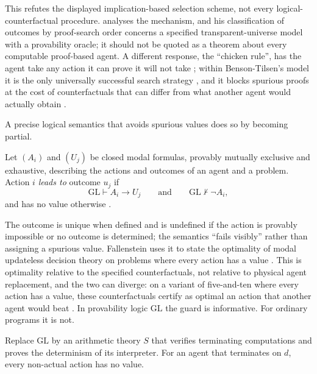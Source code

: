 This refutes the displayed implication-based selection scheme, not every logical-counterfactual
procedure. \textcite[§2]{bensontilsen2014} analyses the mechanism, and his classification of
outcomes by proof-search order concerns a specified transparent-universe model with a provability
oracle; it should not be quoted as a theorem about every computable proof-based agent. A different
response, the \enquote{chicken rule}, has the agent take any action it can prove it will not take
\autocite{slepnev2011}; within Benson-Tilsen's model it is the only universally successful search
strategy \autocite[Corollary~4.6]{bensontilsen2014}, and it blocks spurious proofs at the cost of
counterfactuals that can differ from what another agent would actually obtain
\autocite{fallenstein2015chicken}.

A precise logical semantics that avoids spurious values does so by becoming partial.

\begin{definition}\label{def:guarded}
Let $(A_i)$ and $(U_j)$ be closed modal formulas, provably mutually exclusive and exhaustive, describing
the actions and outcomes of an agent and a problem. Action $i$ \emph{leads to} outcome $u_j$ if
\[
  \mathrm{GL}\vdash A_i\to U_j\qquad\text{and}\qquad\mathrm{GL}\nvdash\neg A_i,
\]
and has no value otherwise \autocite{fallenstein2015third}.
\end{definition}

The outcome is unique when defined and is undefined if the action is provably impossible or no
outcome is determined; the semantics \enquote{fails visibly} rather than assigning a spurious value.
Fallenstein uses it to state the optimality of modal updateless decision theory on problems where
every action has a value \autocite{fallenstein2015third}. This is optimality relative to the specified
counterfactuals, not relative to physical agent replacement, and the two can diverge: on a variant of
five-and-ten where every action has a value, these counterfactuals certify as optimal an action that
another agent would beat \autocite{fallenstein2015chicken}. In provability logic $\mathrm{GL}$
\autocite{boolos1993} the guard is informative. For ordinary programs it is not.

\begin{proposition}\label{prop:guardedarith}
Replace $\mathrm{GL}$ by an arithmetic theory $S$ that verifies terminating computations and proves the
determinism of its interpreter. For an agent that terminates on $d$, every non-actual action has no
value.
\end{proposition}

